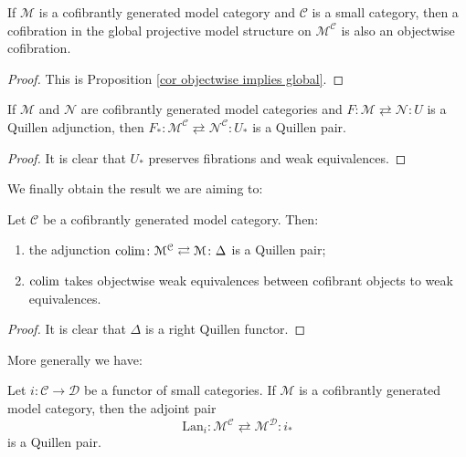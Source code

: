 \begin{refsection}
\begin{cor}
If $\mathcal M$ is a cofibrantly generated model category and $\mathcal C$ is a small category, then a cofibration in the global projective model structure on $\mathcal M^{\mathcal C}$ is also an objectwise cofibration.
\end{cor}

\begin{proof}
This is Proposition \ref{cor objectwise implies global}.
\end{proof}

\begin{cor}
If $\mathcal M$ and $\mathcal N$ are cofibrantly generated model categories and $F \colon \mathcal M \rightleftarrows \mathcal N \colon U$ is a Quillen adjunction, then $F_* \colon \mathcal M^{\mathcal C} \rightleftarrows \mathcal N^{\mathcal C} \colon U_*$ is a Quillen pair.
\end{cor}

\begin{proof}
It is clear that $U_*$ preserves fibrations and weak equivalences.
\end{proof}

We finally obtain the result we are aiming to:

\begin{thm}
Let $\mathcal C$ be a cofibrantly generated model category. Then:
\begin{enumerate}
\item the adjunction $\operatorname*{colim} \colon \mathcal M^{\mathcal C} \rightleftarrows \mathcal M \colon \Delta$ is a Quillen pair;
\item $\operatorname*{colim}$ takes objectwise weak equivalences between cofibrant objects to weak equivalences.
\end{enumerate}
\end{thm}

\begin{proof}
It is clear that $\Delta$ is a right Quillen functor.
\end{proof}

More generally we have:

\begin{thm}
Let $i \colon \mathcal C \to \mathcal D$ be a functor of small categories. If $\mathcal M$ is a cofibrantly generated model category, then the adjoint pair
\[
\mathrm{Lan}_i \colon \mathcal M^{\mathcal C} \rightleftarrows \mathcal M^{\mathcal D} \colon i_*
\]
is a Quillen pair.
\end{thm}


\end{refsection}
